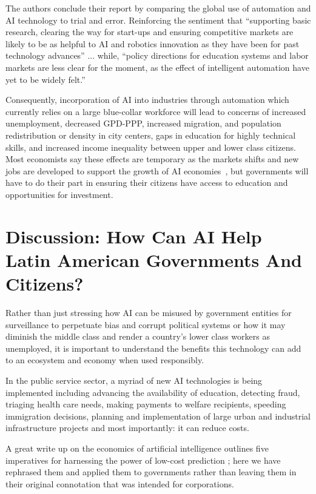 \documentclass[conference]{IEEEtran}
\begin{document}
The authors conclude their report by comparing the global use of automation and AI technology to trial and error. Reinforcing the sentiment that ``supporting basic research, clearing the way for start-ups and ensuring competitive markets are likely to be as helpful to AI and robotics innovation as they have been for past technology advances'' ... while, ``policy directions for education systems and labor markets are less clear for the moment, as the effect of intelligent automation have yet to be widely felt.''

Consequently, incorporation of AI into industries through automation which currently relies on a large blue-collar workforce will lead to concerns of increased unemployment, decreased GPD-PPP, increased migration, and population redistribution or density in city centers, gaps in education for highly technical skills, and increased income inequality between upper and lower class citizens. Most economists say these effects are temporary as the markets shifts and new jobs are developed to support the growth of AI economies~\cite{manyika2017future,intelligence2016automation,manyika2017jobs}, but governments will have to do their part in ensuring their citizens have access to education and opportunities for investment.


\section{Discussion: How Can AI Help Latin American Governments And Citizens?}

Rather than just stressing how AI can be misused by government entities for surveillance to perpetuate bias and corrupt political systems or how it may diminish the middle class and render a country's lower class workers as unemployed, it is important to understand the benefits this technology can add to an ecosystem and economy when used responsibly.

In the public service sector, a myriad of new AI technologies is being implemented including advancing the availability of education, detecting fraud, triaging health care needs, making payments to welfare recipients, speeding immigration decisions, planning and implementation of large urban and industrial infrastructure projects and most importantly: it can reduce costs.

A great write up on the economics of artificial intelligence outlines five imperatives for harnessing the power of low-cost prediction \cite{agrawal2018economics}; here we have rephrased them and applied them to governments rather than leaving them in their original connotation that was intended for corporations. 
\end{document}

